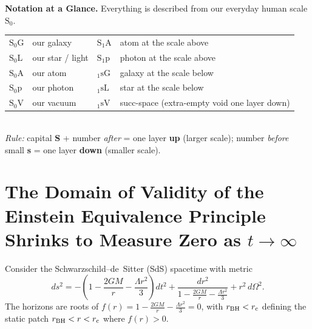 \documentclass[11pt,letterpaper]{article}
\newcommand{\Su}[2]{\mathrm{S}_{#1}\mathrm{#2}}
\newcommand{\Sd}[2]{{}_{#1}\mathrm{s}\mathrm{#2}}
\begin{document}
\medskip
\begin{mdframed}[backgroundcolor=gray!10]
\textbf{Notation at a Glance.}
Everything is described from our everyday human scale $\Su{0}{}$.\\[2pt]
\begin{tabular}{@{}ll@{\qquad}ll@{}}
$\Su{0}{G}$ & our galaxy &
$\Su{1}{A}$ & atom at the scale above \\
$\Su{0}{L}$ & our star / light &
$\Su{1}{p}$ & photon at the scale above \\
$\Su{0}{A}$ & our atom &
$\Sd{1}{G}$ & galaxy at the scale below \\
$\Su{0}{p}$ & our photon &
$\Sd{1}{L}$ & star at the scale below \\
$\Su{0}{V}$ & our vacuum &
$\Sd{1}{V}$ & succ-space (extra-empty void one layer down) \\
\end{tabular}\\[4pt]
\textit{Rule:} capital \textbf{S} + number \textit{after} = one layer \textbf{up}
(larger scale); number \textit{before} small \textbf{s} = one layer \textbf{down}
(smaller scale).
\end{mdframed}
\tableofcontents
\newpage

\section{The Domain of Validity of the Einstein Equivalence Principle Shrinks to
Measure Zero as $t \to \infty$}
\label{sec:eep}
Consider the Schwarzschild--de~Sitter (SdS) spacetime with metric
\begin{equation}
ds^2 = -\!\left(1 - \frac{2GM}{r} - \frac{\Lambda r^2}{3}\right)dt^2
     + \frac{dr^2}{1-\frac{2GM}{r}-\frac{\Lambda r^2}{3}}
     + r^2\,d\Omega^2.
\end{equation}
The horizons are roots of $f(r)=1-\tfrac{2GM}{r}-\tfrac{\Lambda r^2}{3}=0$, with
$r_{\rm BH}<r_{\rm c}$ defining the static patch $r_{\rm BH}<r<r_{\rm c}$ where
$f(r)>0$.
\end{document}
